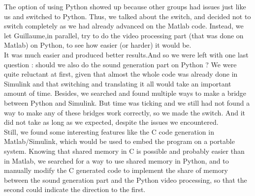 \documentclass{rapport}
\begin{document}
The option of using Python showed up because other groups had issues just like us and switched to Python. Thus, we talked about the switch, and decided not to switch completely as we had already advanced on the Matlab code. Instead, we let Guillaume,in parallel, try to do the video processing part (that was done on Matlab) on Python, to see how easier (or harder) it would be.\\
It was much easier and produced better results.And so we were left with one last question : should we also do the sound generation part on Python ?
We were quite reluctant at first, given that almost the whole code was already done in Simulink and that switching and translating it all would take an important amount of time. Besides, we searched and found multiple ways to make a bridge between Python and Simulink. But time was ticking and we still had not found a way to make any of these bridges work correctly, so we made the switch. And it did not take as long as we expected, despite the issues we encountered. \\
Still, we found some interesting features like the C code generation in Matlab/Simulink, which would be used to embed the program on a portable system. Knowing that shared memory in C is possible and probably easier than in Matlab, we searched for a way to use shared memory in Python, and to manually modify the C generated code to implement the share of memory between the sound generation part and the Python video processing, so that the second could indicate the direction to the first.\\
\end{document}
